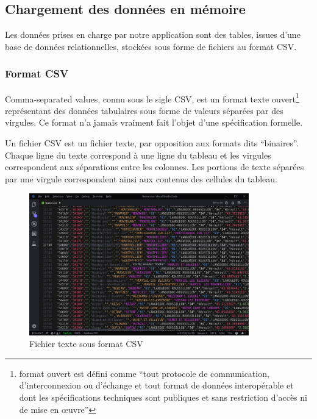 \documentclass[oneside,13pt,a4paper]{report}
\begin{document}
\subsection{Chargement des données en mémoire}

Les données prises en charge par notre application sont des tables, issues d'une base de données relationnelles, stockées sous forme de fichiers au format CSV.

\subsubsection{Format CSV}
\label{csv}
Comma-separated values, connu sous le sigle CSV, est un format texte ouvert\footnote{format ouvert est défini comme \enquote{tout protocole de communication, d'interconnexion ou d'échange et tout format de données interopérable et dont les spécifications techniques sont publiques et sans restriction d'accès ni de mise en œuvre}} représentant des données tabulaires sous forme de valeurs séparées par des virgules. Ce format n'a jamais vraiment fait l'objet d'une spécification formelle.

Un fichier CSV est un fichier texte, par opposition aux formats dits \enquote{binaires}. Chaque ligne du texte correspond à une ligne du tableau et les virgules correspondent aux séparations entre les colonnes. Les portions de texte séparées par une virgule correspondent ainsi aux contenus des cellules du tableau.

\begin{figure}[!h]
	\centering
	\includegraphics[width=0.85\textwidth]{img/csv.png}
	\caption{Fichier texte sous format CSV}
\end{figure}
\end{document}
